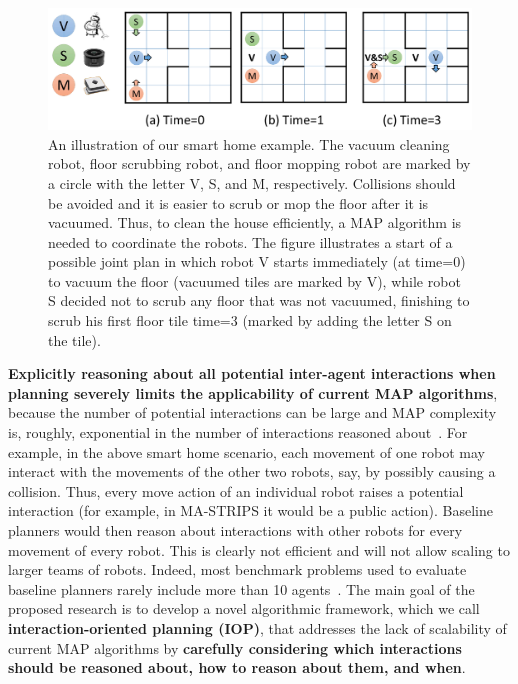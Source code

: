 \documentclass[11pt]{article}
\begin{document}
\begin{figure}[h]
\centering
\includegraphics[width=0.7\columnwidth]{RunningExample_cropped.pdf}
\vspace{-0.4cm}
\caption{\small{An illustration of our smart home example. The vacuum cleaning robot, floor scrubbing robot, and floor mopping robot are marked by a circle with the letter V, S, and M, respectively. Collisions should be avoided and it is easier to scrub or mop the floor after it is vacuumed. Thus, to clean the house efficiently, a MAP algorithm is needed to coordinate the robots. The figure illustrates a start of a possible joint plan in which robot V starts immediately (at time=0) to vacuum the floor (vacuumed tiles are marked by V), while robot S decided not to scrub any floor that was not vacuumed, finishing to scrub his first floor tile time=3 (marked by adding the letter S on the tile). }}
\label{fig:example}
\end{figure}

{\bf Explicitly reasoning about all potential inter-agent interactions when planning severely limits the applicability of current MAP algorithms}, because the number of potential interactions can be large and MAP complexity is, roughly, exponential in the number of interactions reasoned about~\cite{brafman2013complexity,witwicki2011towards}. For example, in the above smart home scenario, each movement of one robot may interact with the movements of the other two robots, say, by possibly causing a collision. Thus, every move action of an individual robot raises a potential interaction (for example, in MA-STRIPS it would be a public action). %
Baseline planners would then reason about interactions with other robots for every movement of every robot. This is clearly not efficient and will not allow scaling to larger teams of robots. 
Indeed, most benchmark problems used to evaluate baseline planners rarely include more than 10 agents~\cite{vstolba2015competition}. 
The main goal of the proposed research is to develop a novel algorithmic framework, which we call {\bf interaction-oriented planning (IOP)}, that addresses the lack of scalability of current MAP algorithms by {\bf carefully considering which interactions should be reasoned about, how to reason about them, and when}. 
\end{document}

